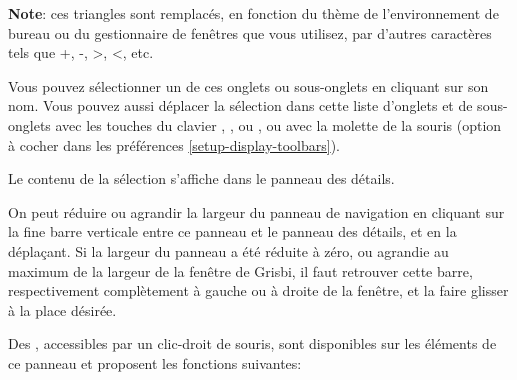 
\textbf{Note}: ces triangles sont remplacés, en fonction du thème de l'environnement de bureau ou du gestionnaire de fenêtres que vous utilisez, par d'autres caractères tels que +, -, >, <, etc.

Vous pouvez sélectionner un de ces onglets ou sous-onglets en cliquant sur son nom. Vous pouvez aussi déplacer la sélection dans cette liste d'onglets et de sous-onglets avec les touches du clavier \keys{\arrowkeyup}, \keys{\arrowkeydown},  ou , ou avec la molette de la souris (option à cocher dans les préférences \vref{setup-display-toolbars}). 


Le contenu de la sélection s'affiche dans le panneau des détails. 

On peut réduire ou agrandir la largeur du panneau de navigation en cliquant sur la fine barre verticale entre ce panneau et le panneau des détails, et en la déplaçant. Si la largeur du panneau a été réduite à zéro, ou agrandie au maximum de la largeur de la fenêtre de Grisbi, il faut retrouver cette barre, respectivement complètement à gauche ou à droite de la fenêtre, et la faire glisser à la place désirée. 

Des , accessibles par un clic-droit de souris, sont disponibles sur les éléments de ce panneau et proposent les fonctions suivantes:

